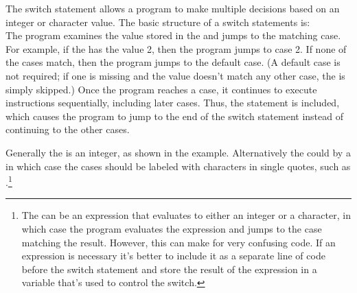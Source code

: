 The switch statement allows a program to make multiple decisions based on an integer or character value.  The basic structure of a switch statements is:\\
The program examines the value stored in the  and jumps to the matching case.  For example, if the  has the value 2, then the program jumps to case 2.  If none of the cases match, then the program jumps to the default case.  (A default case is not required; if one is missing and the  value doesn't match any other case, the  is simply skipped.)  Once the program reaches a case, it continues to execute instructions sequentially, including later cases.  Thus, the  statement is included, which causes the program to jump to the end of the switch statement instead of continuing to the other cases.

Generally the  is an integer, as shown in the example.  Alternatively the  could by a  in which case the cases should be labeled with characters in single quotes, such as .\footnote{
The  can be an expression that evaluates to either an integer or a character, in which case the program evaluates the expression and jumps to the case matching the result.  However, this can make for very confusing code.  If an expression is necessary it's better to include it as a separate line of code before the switch statement and store the result of the expression in a variable that's used to control the switch.}  


